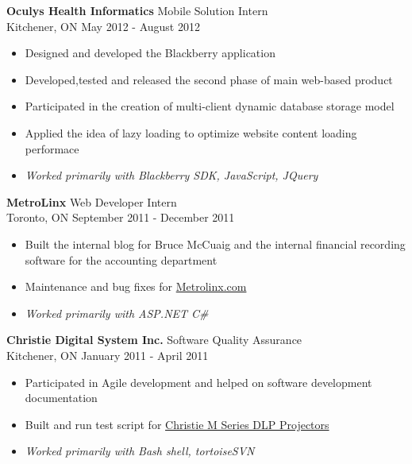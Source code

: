 \begin{resume}
{\bf Oculys Health Informatics} \hfill Mobile Solution Intern \\
Kitchener, ON \hfill May 2012 - August 2012
\begin{itemize}
\item Designed and developed the Blackberry application
\item Developed,tested and released the second phase of main web-based product
\item Participated in the creation of multi-client dynamic database storage model
\item Applied the idea of lazy loading to optimize website content loading performace
\item {\it Worked primarily with Blackberry SDK, JavaScript, JQuery}
\end{itemize}

{\bf MetroLinx} \hfill Web Developer Intern \\
Toronto, ON \hfill September 2011 - December 2011
\begin{itemize}
\item Built the internal blog for Bruce McCuaig and the internal financial recording software for the accounting department
\item Maintenance and bug fixes for \href{http://www.metrolinx.com/en/aboutus/about_us_index.aspx}{Metrolinx.com}
\item {\it Worked primarily with ASP.NET C\#}
\end{itemize}

{\bf Christie Digital System Inc.} \hfill Software Quality Assurance \\
Kitchener, ON \hfill January 2011 - April 2011
\begin{itemize}
\item Participated in Agile development and helped on software development documentation
\item Built and run test script for \href{http://www.christiedigital.com/en-us/business/products/projectors/3-chip-dlp/m-series/pages/default.aspx}{Christie M Series DLP Projectors}
\item {\it Worked primarily with Bash shell, tortoiseSVN}
\end{itemize}


\end{resume}
